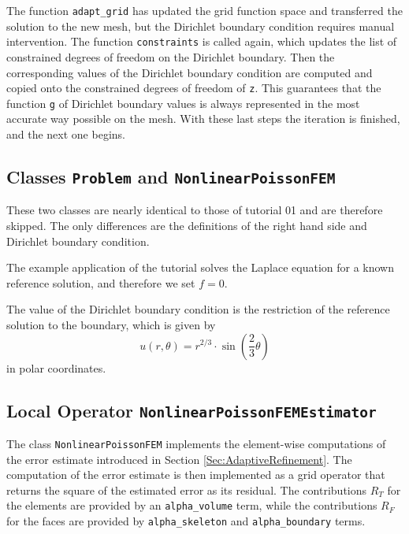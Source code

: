 \documentclass[a4paper,12pt]{article}
\begin{document}

The function \lstinline{adapt_grid} has updated the grid function space and transferred the
solution to the new mesh, but the Dirichlet boundary condition requires manual intervention.
The function \lstinline{constraints} is called again, which updates the list of constrained
degrees of freedom on the Dirichlet boundary. Then the corresponding values of the Dirichlet
boundary condition are computed and copied onto the constrained degrees of freedom of
\lstinline{z}. This guarantees that the function \lstinline{g} of Dirichlet boundary values
is always represented in the most accurate way possible on the mesh. With these last steps
the iteration is finished, and the next one begins.

\subsection{Classes \lstinline{Problem} and \lstinline{NonlinearPoissonFEM}}

These two classes are nearly identical to those of tutorial 01 and are therefore skipped.
The only differences are the definitions of the right hand side and Dirichlet boundary
condition.


The example application of the tutorial solves the Laplace equation for a known reference
solution, and therefore we set $f = 0$.


The value of the Dirichlet boundary condition is the restriction of the reference solution
to the boundary, which is given by
\begin{equation*}
  u (r, \theta) = r^{2/3} \cdot \sin\left(\frac{2}{3} \theta\right)
\end{equation*}
in polar coordinates.

\subsection{Local Operator \lstinline{NonlinearPoissonFEMEstimator}}

The class \lstinline{NonlinearPoissonFEM} implements the
element-wise computations of the error estimate introduced in
Section \ref{Sec:AdaptiveRefinement}. The computation of the error
estimate is then implemented as a grid operator that returns the square of the
estimated error as its residual. The contributions $R_T$ for the elements
are provided by an \lstinline{alpha_volume} term, while the contributions
$R_F$ for the faces are provided by \lstinline{alpha_skeleton} and
\lstinline{alpha_boundary} terms.
\end{document}
